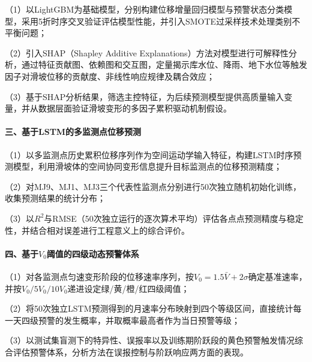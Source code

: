 \documentclass[12pt,a4paper]{article}
\begin{document}
    （1）以LightGBM为基础模型，分别构建位移增量回归模型与预警状态分类模型，采用5折时序交叉验证评估模型性能，并引入SMOTE过采样技术处理类别不平衡问题；

    （2）引入SHAP（Shapley Additive Explanations）方法对模型进行可解释性分析，通过特征贡献图、依赖图和交互图，定量揭示库水位、降雨、地下水位等触发因子对滑坡位移的贡献度、非线性响应规律及耦合效应；

    （3）基于SHAP分析结果，筛选主控特征，为后续预测模型提供高质量输入变量，并从数据层面验证滑坡变形的多因子累积驱动机制假设。

\paragraph{三、基于LSTM的多监测点位移预测}

    （1）以多监测点历史累积位移序列作为空间运动学输入特征，构建LSTM时序预测模型，利用滑坡体的空间协同变形信息提升目标监测点的位移预测精度；

    （2）对MJ9、MJ1、MJ3三个代表性监测点分别进行50次独立随机初始化训练，收集预测结果的统计分布；

    （3）以$R^2$与RMSE（50次独立运行的逐次算术平均）评估各点点预测精度与稳定性，并结合相对误差进行工程意义上的综合评价。

\paragraph{四、基于$V_0$阈值的四级动态预警体系}

    （1）对各监测点匀速变形阶段的位移速率序列，按$V_0 = 1.5\bar V + 2\sigma$确定基准速率，并按$V_0/5V_0/10V_0$递进设定绿/黄/橙/红四级阈值；

    （2）将50次独立LSTM预测得到的月速率分布映射到四个等级区间，直接统计每一天四级预警的发生概率，并取概率最高者作为当日预警等级；

    （3）以测试集盲测下的特异性、误报率以及训练期阶跃段的黄色预警触发情况综合评估预警体系，分析方法在误报控制与阶跃响应两方面的表现。
\end{document}
